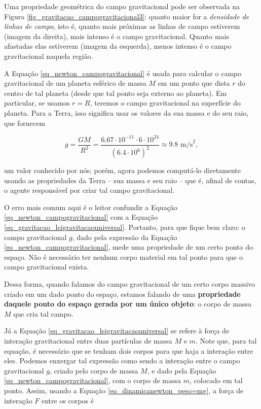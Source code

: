 Uma propriedade geométrica do campo gravitacional pode ser observada na Figura \ref{fig_gravitacao_campogravitacional3}: quanto maior for a \emph{densidade de linhas de campo}, isto é, quanto mais próximas as linhas de campo estiverem (imagem da direita), mais intenso é o campo gravitacional. Quanto mais afastadas elas estiverem (imagem da esquerda), menos intenso é o campo gravitacional naquela região.





A Equação \eqref{eq_newton_campogravitacional} é usada para calcular o campo gravitacional de um planeta esférico de massa $M$ em um ponto que dista $r$ do centro de tal planeta (desde que tal ponto seja externo ao planeta). Em particular, se usamos $r=R$, teremos o campo gravitacional na superfície do planeta. Para a Terra, isso significa usar os valores da sua massa e do seu raio, que fornecem

$$ g = \dfrac{GM}{R^2} = \dfrac{6.67 \cdot 10^{-11} \cdot 6 \cdot 10^{24}}{(6.4 \cdot 10^{6})^2} \approx 9.8 \text{ m/s}^2,$$

\noindent um valor conhecido por nós; porém, agora podemos computá-lo diretamente usando as propriedades da Terra -- sua massa e seu raio -- que é, afinal de contas, o agente responsável por criar tal campo gravitacional.



O erro mais comum aqui é o leitor confundir a Equação \eqref{eq_newton_campogravitacional} com a Equação \eqref{eq_gravitacao_leigravitacaouniversal}. Portanto, para que fique bem claro: o campo gravitacional $g$, dado pela expressão da Equação \eqref{eq_newton_campogravitacional}, mede uma propriedade de um certo ponto do espaço. Não é necessário ter nenhum corpo material em tal ponto para que o campo gravitacional exista. 

Dessa forma, quando falamos do campo gravitacional de um certo corpo massivo criado em um dado ponto do espaço, estamos falando de uma \textbf{propriedade daquele ponto do espaço gerada por um único objeto}: o corpo de massa $M$ que cria tal campo.

Já a Equação \eqref{eq_gravitacao_leigravitacaouniversal} se refere à força de interação gravitacional entre duas partículas de massa $M$ e $m$. Note que, para tal equação, é necessário que se tenham dois corpos para que haja a interação entre eles. Podemos enxergar tal expressão como sendo a interação entre o campo gravitacional $g$, criado pelo corpo de massa $M$, e dado pela Equação \eqref{eq_newton_campogravitacional}, com o corpo de massa $m$, colocado em tal ponto. Assim, usando a Equação \eqref{eq_dinamicanewton_peso=mg}, a força de interação $F$ entre os corpos é


